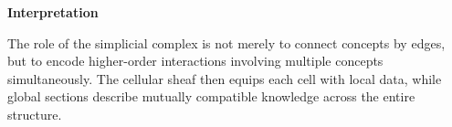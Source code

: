 
\begin{remarkbox}

\BodyFont

\textbf{Interpretation}

The role of the simplicial complex is not merely to connect concepts by
edges, but to encode higher-order interactions involving multiple concepts
simultaneously. The cellular sheaf then equips each cell with local data,
while global sections describe mutually compatible knowledge across the
entire structure.

\end{remarkbox}